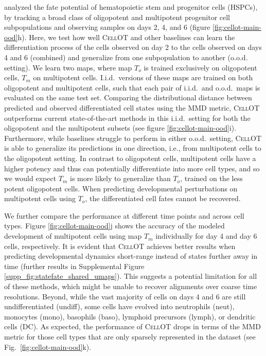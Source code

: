 \citet{weinreb2020} analyzed the fate potential of hematopoietic stem and progenitor cells (HSPCs), by tracking a broad class of oligopotent %
and multipotent %
progenitor cell subpopulations and observing samples on days 2, 4, and 6 (figure \ref{fig:cellot-main-ood}h).
Here, we test how well \textsc{CellOT} and other baselines can learn the differentiation process of the cells observed on day 2 to the cells observed on days 4 and 6 (combined) and generalize from one subpopulation to another (o.o.d. setting).
We learn two maps, where map $T_o$ is trained exclusively on oligopotent cells, $T_m$ on multipotent cells.
I.i.d.~versions of these maps are trained on both oligopotent and multipotent cells, such that each pair of i.i.d.~and o.o.d.~maps is evaluated on the same test set.
Comparing the distributional distance between predicted and observed differentiated cell states using the MMD metric, \textsc{CellOT} outperforms current state-of-the-art methods in this i.i.d.~setting for both the oligopotent and the multipotent subsets (see figure \ref{fig:cellot-main-ood}i).
Furthermore, while baselines struggle to perform in either o.o.d.~setting, \textsc{CellOT} is able to generalize its predictions in one direction, i.e., from multipotent cells to the oligopotent setting.
In contrast to oligopotent cells, multipotent cells have a higher potency and thus can potentially differentiate into more cell types, and so we would expect $T_m$ is more likely to generalize than $T_o$, trained on the less potent oligopotent cells.
When predicting developmental perturbations on multipotent cells using $T_o$, the differentiated cell fates cannot be recovered.

We further compare the performance at different time points and across cell types.
Figure \ref{fig:cellot-main-ood}j shows the accuracy of the modeled development of multipotent cells using map $T_m$ individually for day 4 and day 6 cells, respectively.
It is evident that \textsc{CellOT} achieves better results when predicting developmental dynamics short-range instead of states further away in time (further results in Supplemental Figure \ref{supp_fig:statefate_shared_umaps}).
This suggests a potential limitation for all of these methods, which might be unable to recover alignments over coarse time resolutions.
Beyond, while the vast majority of cells on days 4 and 6 are still undifferentiated (undiff), some cells have evolved into neutrophils (neut), monocytes (mono), basophils (baso), lymphoid precursors (lymph), or dendritic cells (DC).
As expected, the performance of \textsc{CellOT} drops in terms of the MMD metric for those cell types that are only sparsely represented in the dataset (see Fig.~\ref{fig:cellot-main-ood}k).
